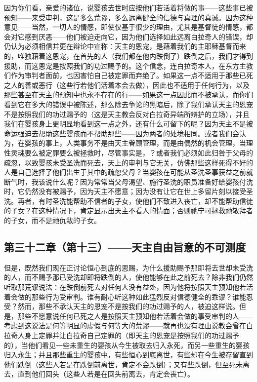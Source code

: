 因为你们看，亲爱的诸位，说婴孩去世时应按他们若活着将做的事——这些事已被预知——来受审判，这是多么荒谬，多么远离健全的信德与真理的真诚。因为这种意见——当然，一切人的情感，即使仅基于很少的理由，尤其是基督徒的情感，都会对它感到厌恶——他们被迫走向它，因为他们选择如此远离白拉奇人的错误，却仍认为必须相信并更在辩论中宣称：天主的恩宠，是藉着我们的主耶稣基督而来的，唯独藉着这恩宠，在首先的人（我们都在他内跌倒了）跌倒之后，我们才得到援助，而这恩宠是按照我们的功过赐予的。这个信念，连白拉奇本人，在东方主教们作为审判者面前，也因害怕自己被定罪而弃绝了。如果这一点不适用于那些已死之人的善或恶行（这些行若他们活着本会去做），因此也不适用于任何行为，以及那些甚至在天主的预知中也永不存在的行——如果这一点因此而不被承认，而你们看到它在多大的错误中被陈述，那么除去争论的黑暗后，除了我们承认天主的恩宠不是按照我们的功过赐予的（这是天主教会反对白拉奇异端所辩护的立场），并且我们在婴孩身上更明显地看到这一点之外，还有什么可留下的呢？因为天主不是被命运强迫去帮助这些婴孩而不帮助那些——因为两者的处境相同。或者我们会认为，在婴孩的事上，人类事务不是由天主眷顾管理，而是由偶然的机会管理，当理性灵魂要么被定罪要么被拯救时，尽管事实是，？或者我们必须如此归咎于父母的疏忽，以致婴孩未受圣洗而死去，天上的审判与它无关，仿佛那些这样死得不好的人是自己选择了他们出生于其中的疏忽父母？当婴孩在可能从圣洗圣事获益之前就断气时，我该说什么呢？因为常常当父母渴望、施行圣洗的职员准备好给婴孩付洗时，它仍然没有被赐予，因为天主不愿意；因为没有让它在世上多留片刻以接受圣洗。再者，有时圣洗能帮助不信者的子女，使他们不致进入丧亡，却不能帮助信徒的子女？在这种情况下，肯定显示出天主不看人的情面；否则祂宁可拯救祂敬拜者的子女，而不是祂仇敌的子女。\par


\subsection{第三十二章（第十三）——天主自由旨意的不可测度}

但是，既然我们现在正讨论恒心到底的恩赐，为什么援助赐予那即将去世却未受洗的人，而不赐予那已受洗却即将跌倒的人，使他能够在此之前死去？除非我们仍然听取那荒谬说法：在跌倒前死去对任何人没有益处，因为他将按照天主预知他若活着会做的那些行为受审判。谁有耐心听这种如此猛烈反对信德健全的乖谬？谁能忍受？然而，那些不承认天主的恩宠不是按我们的功过赐予的人，被迫这样说。但是，那些不愿意说任何已死之人是按照天主预知他若活着会做的事受审判的人——考虑到这说法是何等明显的虚假与何等大的荒谬——就再也没有理由说教会曾在白拉奇人身上定罪并让白拉奇自己定罪的（即天主的恩宠是按照我们的功过赐予的），当他们看见一些未重生的婴孩从今生被取去归入永死，而另一些重生的婴孩归入永生；并且那些重生的婴孩中，有些恒心到底离世，有些却在今生被存留直到他们跌倒（这些人若是在跌倒前离世，肯定不会跌倒）；又有些跌倒，但至死未离去，直到他们回头（这些人若是在回头前离去，肯定会丧亡）。\par

